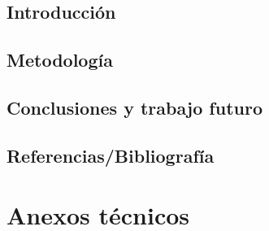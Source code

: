 \documentclass{book}
\begin{document}
	\chapter{Introducción}
	
	
	
	
	\chapter{Metodología}
	
	
	
	
	

	\chapter{Conclusiones y trabajo futuro}
	
	
	\chapter{Referencias/Bibliografía}
	
	
	\part{Anexos técnicos}
	\appendix
%	
	
	
	
\end{document}
